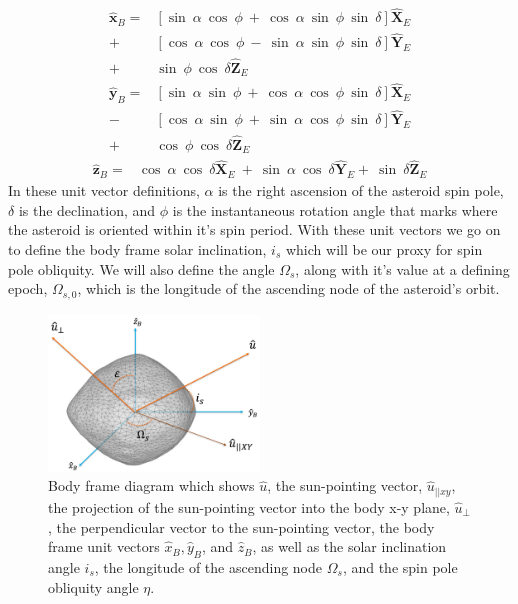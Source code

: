 \begin{equation}
    \begin{split}
    \mathbf{\hat{x}}_B = &[\sin \: \alpha \: \cos \: \phi \: + \: \cos \: \alpha \: \sin \: \phi \: \sin \: \delta]\mathbf{\hat{X}}_E \\
    + &[\cos \: \alpha \: \cos \: \phi \: - \: \sin \: \alpha \: \sin \: \phi \: \sin \: \delta]\mathbf{\hat{Y}}_E \\
    + &\sin \: \phi \: \cos \: \delta \mathbf{\hat{Z}}_E
    \end{split}
\end{equation}
\begin{equation}
    \begin{split}
    \mathbf{\hat{y}}_B = &[\sin \: \alpha \: \sin \: \phi \: + \: \cos \: \alpha \: \cos \: \phi \: \sin \: \delta]\mathbf{\hat{X}}_E \\
    - &[\cos \: \alpha \: \sin \: \phi \: + \: \sin \: \alpha \: \cos \: \phi \: \sin \: \delta]\mathbf{\hat{Y}}_E \\
    + &\cos \: \phi \: \cos \: \delta \mathbf{\hat{Z}}_E
    \end{split}
\end{equation}
\begin{equation}
    \begin{split}
    \mathbf{\hat{z}}_B = &\cos \: \alpha \: \cos\: \delta\mathbf{\hat{X}}_E \:+ \: \sin \: \alpha \: \cos \: \delta\mathbf{\hat{Y}}_E  + \: \sin \: \delta \mathbf{\hat{Z}}_E
    \end{split}
\end{equation}
In these unit vector definitions, $\alpha$ is the right ascension of the asteroid spin pole, $\delta$ is the declination, and $\phi$ is the instantaneous rotation angle that marks where the asteroid is oriented within it's spin period. With these unit vectors we go on to define the body frame solar inclination, $i_s$ which will be our proxy for spin pole obliquity. We will also define the angle $\Omega_s$, along with it's value at a defining epoch, $\Omega_{s,0}$, which is the longitude of the ascending node of the asteroid's orbit.
\begin{figure}[H]
    \centering
    \includegraphics[width=0.5\textwidth]{fig/body_frame_w_obliq.jpg}
    \caption{Body frame diagram which shows $\hat{u}$, the sun-pointing vector, $\hat{u}_{||xy}$, the projection of the sun-pointing vector into the body x-y plane, $\hat{u}_{\perp}$, the perpendicular vector to the sun-pointing vector, the body frame unit vectors $\hat{x}_B, \hat{y}_B$, and $\hat{z}_B$, as well as the solar inclination angle $i_s$, the longitude of the ascending node $\Omega_s$, and the spin pole obliquity angle $\eta$. }
    \label{body_frame}
\end{figure}

